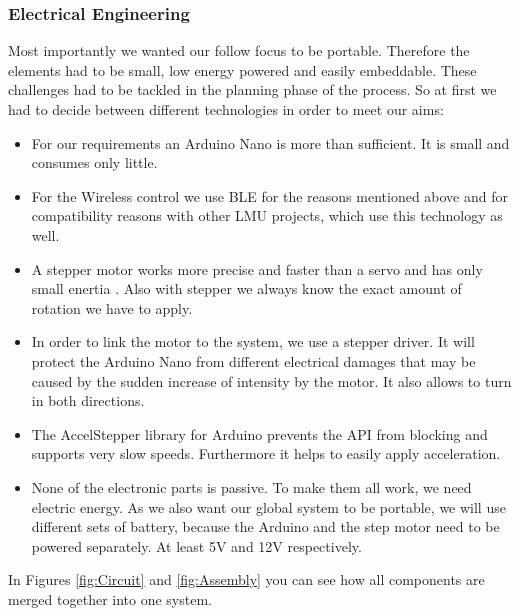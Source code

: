 \documentclass{sigchi}
\begin{document}
\subsubsection{Electrical Engineering}
Most importantly we wanted our follow focus to be portable. Therefore the elements had to be small, low energy powered and easily embeddable. These challenges had to be tackled in the planning phase of the process. So at first we had to decide between different technologies in order to meet our aims:
\begin{itemize}

\item For our requirements an Arduino Nano is more than sufficient. It is small and consumes only little.

\item For the Wireless control we use BLE for the reasons mentioned above and for compatibility reasons with other LMU projects, which use this technology as well.

\item A stepper motor works more precise and faster than a servo and has only small enertia \cite{steppervsservo}. Also with stepper we always know the exact amount of rotation we have to apply.

\item In order to link the motor to the system, we use a stepper driver. It will protect the Arduino Nano from different electrical damages that may be caused by the sudden increase of intensity by the motor. It also allows to turn in both directions.
\item The AccelStepper library for Arduino prevents the API from blocking and supports very slow speeds. Furthermore it helps to easily apply acceleration.
\item None of the electronic parts is passive. To make them all work, we need electric energy. As we also want our global system to be portable, we will use different sets of battery, because the Arduino and the step motor need to be powered separately. At least 5V and 12V respectively.
\end{itemize}
In Figures \ref{fig:Circuit} and \ref{fig:Assembly} you can see how all components are merged together into one system.
\end{document}
